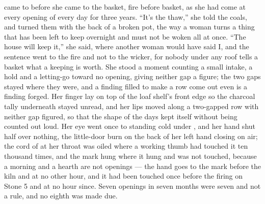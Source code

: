  came to  before she came to the basket, fire before basket, as she had come at every opening of every day for three years. “It's the thaw,” she told the coals, and turned them with the back of a broken pot, the way a woman turns a thing that has been left to keep overnight and must not be woken all at once. “The house will keep it,” she said, where another woman would have said I, and the sentence went to the fire and not to the wicker, for nobody under any roof tells a basket what a keeping is worth. She stood a moment counting a small intake, a hold and a letting-go toward no opening, giving neither gap a figure; the two gaps stayed where they were, and a finding filled to make a row come out even is a finding forged. Her finger lay on top of the loaf shelf's front edge so the charcoal tally underneath stayed unread, and her lips moved along a two-gapped row with neither gap figured, so that the shape of the days kept itself without being counted out loud. Her eye went once to  standing cold under , and her hand shut half over nothing, the little-door burn on the back of her left hand closing on air; the cord of  at her throat was oiled where a working thumb had touched it ten thousand times, and the mark hung where it hung and was not touched, because a morning and a hearth are not openings --- the hand goes to the mark before the kiln and at no other hour, and it had been touched once before the firing on Stone 5 and at no hour since. Seven openings in seven months were seven and not a rule, and no eighth was made due.

